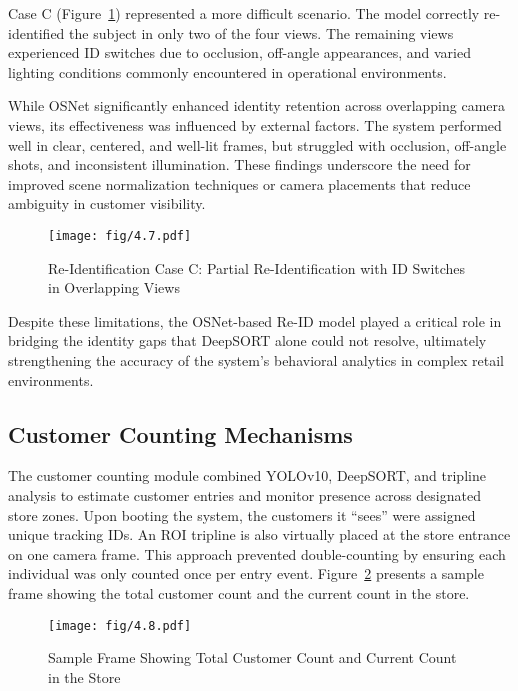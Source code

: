 {Case C (Figure~\ref{fig:4.7}) represented a more difficult scenario. The model correctly re-identified the subject in only two of the four views. The remaining views experienced ID switches due to occlusion, off-angle appearances, and varied lighting conditions commonly encountered in operational environments.

While OSNet significantly enhanced identity retention across overlapping camera views, its effectiveness was influenced by external factors. The system performed well in clear, centered, and well-lit frames, but struggled with occlusion, off-angle shots, and inconsistent illumination. These findings underscore the need for improved scene normalization techniques or camera placements that reduce ambiguity in customer visibility.

\begin{figure}[H]
	\caption[Re-Identification Case C: Partial Re-Identification with ID Switches in Overlapping Views]{\newline \newline Re-Identification Case C: Partial Re-Identification with ID Switches in Overlapping Views}
	\centering
	\texttt{[image: fig/4.7.pdf]}
	\label{fig:4.7}
\end{figure}

Despite these limitations, the OSNet-based Re-ID model played a critical role in bridging the identity gaps that DeepSORT alone could not resolve, ultimately strengthening the accuracy of the system's behavioral analytics in complex retail environments.

\subsection{Customer Counting Mechanisms}
The customer counting module combined YOLOv10, DeepSORT, and tripline analysis to estimate customer entries and monitor presence across designated store zones. Upon booting the system, the customers it “sees” were assigned unique tracking IDs. An ROI tripline is also virtually placed at the store entrance on one camera frame. This approach prevented double-counting by ensuring each individual was only counted once per entry event. Figure~\ref{fig:4.8} presents a sample frame showing the total customer count and the current count in the store.

\begin{figure}[H]
	\caption[Sample Frame Showing Total Customer Count and Current Count in the Store]{\newline \newline Sample Frame Showing Total Customer Count and Current Count in the Store}
	\centering
	\texttt{[image: fig/4.8.pdf]}
	\label{fig:4.8}
\end{figure}

}
